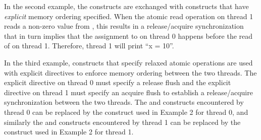 In the second example, the  constructs are exchanged with
 constructs that have \textit{explicit} memory ordering specified. When the
atomic read operation on thread 1 reads a non-zero value from , this
results in a release/acquire synchronization that in turn implies that the
assignment to  on thread 0 happens before the read of  on thread
1. Therefore, thread 1 will print ``x = 10''.


\pagebreak
{}
In the third example,  constructs that specify relaxed atomic
operations are used with explicit  directives to enforce memory
ordering between the two threads. The explicit  directive on thread
0 must specify a release flush and the explicit  directive on
thread 1 must specify an acquire flush to establish a release/acquire
synchronization between the two threads. The  and 
constructs encountered by thread 0 can be replaced by the  construct used in
Example 2 for thread 0, and similarly the  and 
constructs encountered by thread 1 can be replaced by the 
construct used in Example 2 for thread 1.


